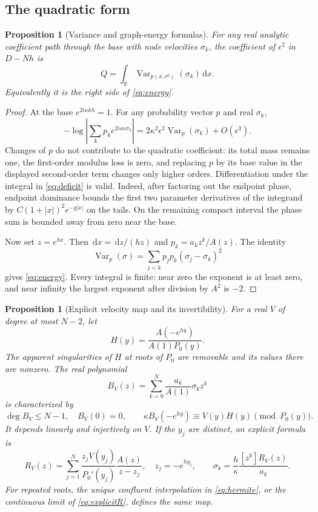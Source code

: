 \documentclass[11pt]{article}
\newtheorem{proposition}[theorem]{Proposition}
\theoremstyle{remark}\newtheorem{remark}[theorem]{Remark}
\newcommand{\R}{\mathbb R}\newcommand{\C}{\mathbb C}
\newcommand{\dd}{\,\mathrm d}\newcommand{\supp}{\operatorname{supp}}
\newcommand{\Var}{\operatorname{Var}}\newcommand{\Res}{\operatorname{Res}}
\newcommand{\abs}[1]{\left\lvert#1\right\rvert}
\begin{document}
\subsection{The quadratic form}

\begin{proposition}[Variance and graph-energy formulas]
\label{prop:variance}
For any real analytic coefficient path through the base with node
velocities $\sigma_k$, the coefficient of $\epsilon^2$ in $D-Nh$ is
\begin{equation}\label{eq:variance}
 Q=\int_\R \Var_{p(x,c^0)}(\sigma_k)\dd x.
\end{equation}
Equivalently it is the right side of \eqref{eq:energy}.
\end{proposition}

\begin{proof}
At the base $e^{2i\kappa kh}=1$. For any probability vector $p$ and real
$\sigma_k$,
\[
 -\log\abs{\sum_kp_ke^{2i\kappa\epsilon\sigma_k}}
 =2\kappa^2\epsilon^2\Var_p(\sigma_k)+O(\epsilon^3).
\]
Changes of $p$ do not contribute to the quadratic coefficient: its total
mass remains one, the first-order modulus loss is zero, and replacing $p$
by its base value in the displayed second-order term changes only higher
orders. Differentiation under the integral in \eqref{eq:deficit} is valid.
Indeed, after factoring out the endpoint phase, endpoint dominance bounds
the first two parameter derivatives of the integrand by
$C(1+\abs x)^2e^{-g\abs x}$ on the tails. On the remaining compact
interval the phase sum is bounded away from zero near the base.

Now set $z=e^{hx}$. Then $\dd x=\dd z/(hz)$ and
$p_k=a_kz^k/A(z)$. The identity
\[
 \Var_p(\sigma)=\sum_{j<k}p_jp_k(\sigma_j-\sigma_k)^2
\]
gives \eqref{eq:energy}. Every integral is finite: near zero the exponent
is at least zero, and near infinity the largest exponent after division
by $A^2$ is $-2$.
\end{proof}

\begin{proposition}[Explicit velocity map and its invertibility]
\label{prop:interpolation}
For a real $V$ of degree at most $N-2$, let
\[
 H(y)=\frac{A(-e^{hy})}{A(1)P_0(y)}.
\]
The apparent singularities of $H$ at roots of $P_0$ are removable and its
values there are nonzero. The real polynomial
\[
 B_V(z)=\sum_{k=0}^N\frac{a_k}{A(1)}\sigma_k z^k
\]
is characterized by
\begin{equation}\label{eq:hermite}
 \deg B_V\le N-1,\quad B_V(0)=0,\qquad
 \kappa B_V(-e^{hy})\equiv V(y)H(y)\pmod{P_0(y)}.
\end{equation}
It depends linearly and injectively on $V$.
If the $y_j$ are distinct, an explicit formula is
\begin{equation}\label{eq:explicitR}
 R_V(z)=\sum_{j=1}^N\frac{z_jV(y_j)}{P_0'(y_j)}
                     \frac{A(z)}{z-z_j},\quad z_j=-e^{hy_j},\qquad
 \sigma_k=\frac h\kappa\frac{[z^k]R_V(z)}{a_k}.
\end{equation}
For repeated roots, the unique confluent interpolation in
\eqref{eq:hermite}, or the continuous limit of \eqref{eq:explicitR},
defines the same map.
\end{proposition}
\end{document}
